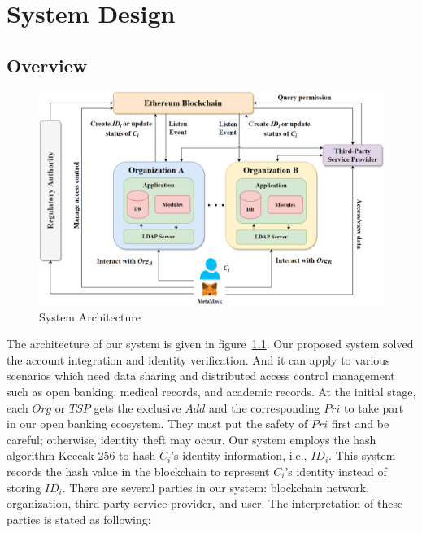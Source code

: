 \chapter{System Design}
\label{chapter:design}

\section{Overview}
    
    \newpage    

    \begin{figure}[htb]
        \centering
        \includegraphics[height=!,width=1\linewidth,keepaspectratio=true]{figures/system_architecture.png}
        \caption{{\footnotesize System Architecture}}
        \label{fig:system_architecture}
    \end{figure}
    The architecture of our system is given in figure~\ref{fig:system_architecture}. Our proposed system solved the account integration and identity verification. And it can apply to various scenarios which need data sharing and distributed access control management such as open banking, medical records, and academic records. At the initial stage, each \(Org\) or \(TSP\) gets the exclusive \(Add\) and the corresponding \(Pri\) to take part in our open banking ecosystem. They must put the safety of \(Pri\) first and be careful; otherwise, identity theft may occur. Our system employs the hash algorithm Keccak-256 to hash \(C_i\)'s identity information, i.e., \(ID_i\). This system records the hash value in the blockchain to represent \(C_i\)'s identity instead of storing \(ID_i\). There are several parties in our system: blockchain network, organization, third-party service provider, and user. The interpretation of these parties is stated as following:\par

